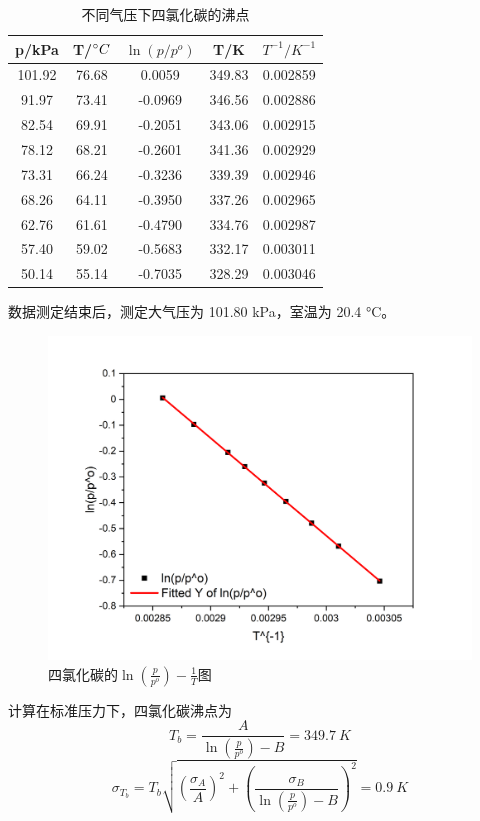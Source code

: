 \documentclass[cn,hazy,pku,12pt,normal,math=newtx,cite=super]{elegantnote}
\begin{document}
\begin{table}[h]
    \centering
    \caption{不同气压下四氯化碳的沸点}
    \label{02}
    \begin{tabular}{ccccc}
    \hline
    p/kPa  & T/$\degree C$ & $\ln(p/p^o)$ & T/K    & $T^{-1}/K^{-1}$ \\ \hline
    101.92 & 76.68         & 0.0059       & 349.83 & 0.002859        \\
    91.97  & 73.41         & -0.0969      & 346.56 & 0.002886        \\
    82.54  & 69.91         & -0.2051      & 343.06 & 0.002915        \\
    78.12  & 68.21         & -0.2601      & 341.36 & 0.002929        \\
    73.31  & 66.24         & -0.3236      & 339.39 & 0.002946        \\
    68.26  & 64.11         & -0.3950      & 337.26 & 0.002965        \\
    62.76  & 61.61         & -0.4790      & 334.76 & 0.002987        \\
    57.40  & 59.02         & -0.5683      & 332.17 & 0.003011        \\
    50.14  & 55.14         & -0.7035      & 328.29 & 0.003046        \\ \hline
    \end{tabular}
\end{table}

数据测定结束后，测定大气压为 101.80 kPa，室温为 20.4 °C。

\begin{figure}[htbp]
    \centering
    \includegraphics[width = .70\textwidth]{image/Graph4.png}
    \caption{四氯化碳的$\ln(\frac{p}{p^o}) - \frac{1}{T}$图}\label{2}
\end{figure}

计算在标准压力下，四氯化碳沸点为
$$
T_b = \frac{A}{\ln(\frac{p}{p^o})-B} = 349.7\ K
$$
$$
\sigma_{T_b} = T_b\sqrt{(\frac{\sigma_A}{A})^2+(\frac{\sigma_B}{\ln(\frac{p}{p^o})-B})^2} = 0.9\ K
$$
\end{document}
